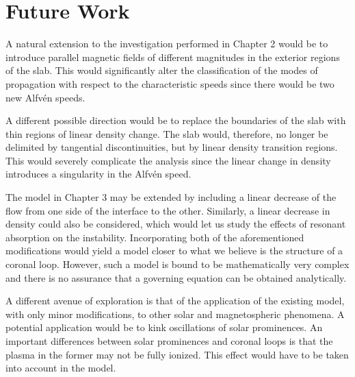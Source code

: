 \section{Future Work}

A natural extension to the investigation performed in Chapter 2 would be to introduce parallel magnetic fields of different magnitudes in the exterior regions of the slab.
This would significantly alter the classification of the modes of propagation with respect to the characteristic speeds since there would be two new Alfv\'en speeds.

A different possible direction would be to replace the boundaries of the slab with thin regions of linear density change.
The slab would, therefore, no longer be delimited by tangential discontinuities, but by linear density transition regions.
This would severely complicate the analysis since the linear change in density introduces a singularity in the Alfv\'en speed.

The model in Chapter 3 may be extended by including a linear decrease of the flow from one side of the interface to the other.
Similarly, a linear decrease in density could also be considered, which would let us study the effects of resonant absorption on the instability.
Incorporating both of the aforementioned modifications would yield a model closer to what we believe is the structure of a coronal loop.
However, such a model is bound to be mathematically very complex and there is no assurance that a governing equation can be obtained analytically.

A different avenue of exploration is that of the application of the existing model, with only minor modifications, to other solar and magnetospheric phenomena.
A potential application would be to kink oscillations of solar prominences.
An important differences between solar prominences and coronal loops is that the plasma in the former may not be fully ionized.
This effect would have to be taken into account in the model.
